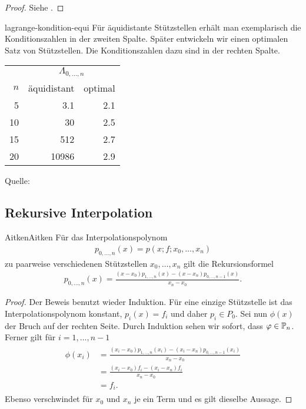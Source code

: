 \begin{proof}
  Siehe \cite[Satz 7.3]{DeuflhardHohmann08}.
\end{proof}

\begin{Beispiel}{lagrange-kondition-equi}
  Für äquidistante Stützstellen erhält man exemplarisch die Konditionszahlen in der zweiten Spalte. Später entwickeln wir einen optimalen Satz von Stützstellen. Die Konditionszahlen dazu sind in der rechten Spalte.
  \begin{center}
    \begin{tabular}{r|rr}
      & \multicolumn{2}{c}{ $\Lambda_{0,\dots,n}$}\\
      $n$ & äquidistant & optimal\\\hline
      5 & 3.1 & 2.1\\
      10 & 30 & 2.5 \\
      15 & 512 & 2.7 \\
      20 & 10986 & 2.9
    \end{tabular}
  \end{center}
  Quelle: \cite{DeuflhardHohmann08}
\end{Beispiel}

\subsection{Rekursive Interpolation}

\begin{Lemma*}{Aitken}{Aitken}
  Für das Interpolationspolynom
  \begin{gather}
    p_{0,\dots,n}(x) = p(x;f;x_0,\dots,x_n)
  \end{gather}
  zu paarweise verschiedenen Stützstellen $x_0,\dots,x_n$ gilt die
  Rekursionsformel
  \begin{gather}
    p_{0,\dots,n}(x)
    = \frac{(x-x_0) p_{1,\dots,n}(x) - (x-x_n) p_{0,\dots,n-1}(x)}{x_n-x_0}.
  \end{gather}
\end{Lemma*}

\begin{proof}
  Der Beweis benutzt wieder Induktion. Für eine einzige Stützstelle ist das Interpolationspolynom konstant, $p_i(x) = f_i$ und daher $p_i\in P_0$.
  Sei nun $\phi(x)$ der Bruch auf der rechten Seite. Durch Induktion sehen wir sofort, dass $\phi\in \P_n$. Ferner gilt für $i=1,\dots,n-1$
  \begin{gather}
    \begin{split}
      \phi(x_i)
      &= \frac{(x_i-x_0) p_{1,\dots,n}(x_i) - (x_i-x_n)p_{0,\dots,n-1}(x_i)}{x_n-x_0}\\
      &= \frac{(x_i-x_0) f_i - (x_i-x_n) f_i}{x_n-x_0}\\
      &= f_i.
    \end{split}
  \end{gather}
  Ebenso verschwindet für $x_0$ und $x_n$ je ein Term und es gilt
  dieselbe Aussage.
\end{proof}

